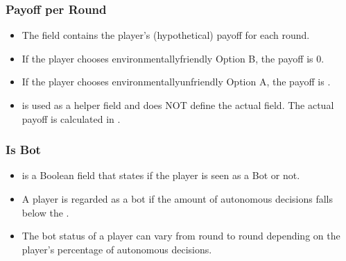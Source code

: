 \documentclass[letterpaper,10pt,english]{sphinxmanual}
\begin{document}
\subsubsection{Payoff per Round}
\label{\detokenize{Player_fields:payoff-per-round}}\begin{itemize}
\item {} 
The  field contains the player’s (hypothetical) payoff for each round.

\item {} 
If the player chooses environmentally\sphinxhyphen{}friendly Option B, the payoff is 0.

\item {} 
If the player chooses environmentally\sphinxhyphen{}unfriendly Option A, the payoff is .

\item {} 
 is used as a helper field and does NOT define the actual  field.
The actual payoff is calculated in {\hyperref[\detokenize{Player_fields:set-payoff-ref}]{}}.

\end{itemize}


\subsubsection{Is Bot}
\label{\detokenize{Player_fields:is-bot}}\begin{itemize}
\item {} 
 is a Boolean field that states if the player is seen as a Bot or not.

\item {} 
A player is regarded as a bot if the amount of autonomous decisions falls below the {\hyperref[\detokenize{Constants:bot-criteria-ref}]{}}.

\item {} 
The bot status of a player can vary from round to round depending on the player’s percentage of autonomous decisions.

\end{itemize}
\end{document}
